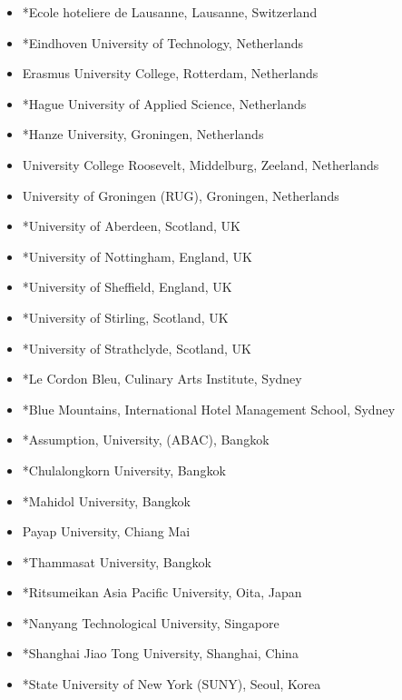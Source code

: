 \documentclass{report}
\begin{document}
\begin{itemize}
\item *Ecole hoteliere de Lausanne, Lausanne, Switzerland
\item *Eindhoven University of Technology, Netherlands
\item Erasmus University College, Rotterdam, Netherlands
\item *Hague University of Applied Science, Netherlands
\item *Hanze University, Groningen, Netherlands
\item University College Roosevelt, Middelburg, Zeeland, Netherlands
\item University of Groningen (RUG), Groningen, Netherlands
\item *University of Aberdeen, Scotland, UK
\item *University of Nottingham, England, UK
\item *University of Sheffield, England, UK
\item *University of Stirling, Scotland, UK
\item *University of Strathclyde, Scotland, UK
\end{itemize}


\begin{itemize}
\item *Le Cordon Bleu, Culinary Arts Institute, Sydney
\item *Blue Mountains, International Hotel Management School, Sydney
\end{itemize}


\begin{itemize}
\item *Assumption, University, (ABAC), Bangkok
\item *Chulalongkorn University, Bangkok
\item *Mahidol University, Bangkok
\item Payap University, Chiang Mai
\item *Thammasat University, Bangkok
\end{itemize}


\begin{itemize}
\item *Ritsumeikan Asia Pacific University, Oita, Japan
\item *Nanyang Technological University, Singapore
\item *Shanghai Jiao Tong University, Shanghai, China
\item *State University of New York (SUNY), Seoul, Korea
\end{itemize}
\end{document}
